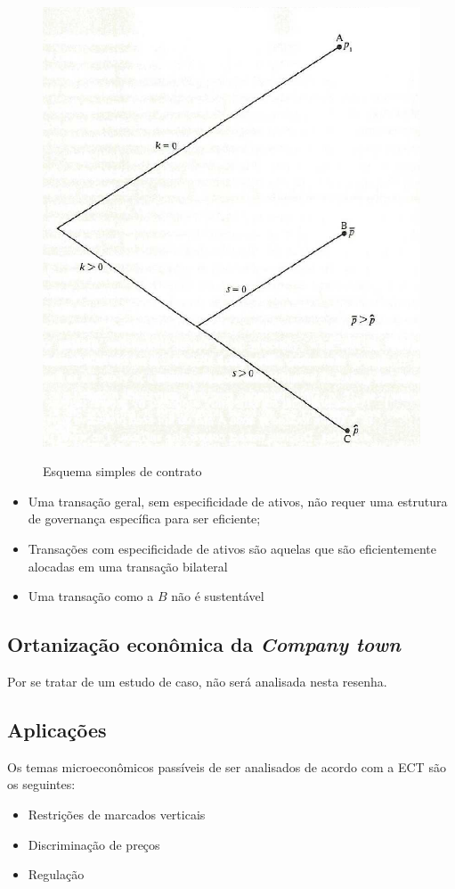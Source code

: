 \begin{figure}
	\centering
	\caption{Esquema simples de contrato}
	\includegraphics[width=0.7\linewidth]{screenshot003}
	\label{fig:screenshot003}
\end{figure}

\begin{itemize}
	\item Uma transação geral, sem especificidade de ativos, não requer uma estrutura de governança específica para ser eficiente;
	\item Transações com especificidade de ativos são aquelas que são eficientemente alocadas em uma transação bilateral
	\item Uma transação como a $B$ não é sustentável
\end{itemize}

\subsection*{Ortanização econômica da \textit{Company town}}

Por se tratar de um estudo de caso, não será analisada nesta resenha.

\subsection*{Aplicações}

Os temas microeconômicos passíveis de ser analisados de acordo com a ECT são os seguintes:
\begin{itemize}
	\item Restrições de marcados verticais
	\item Discriminação de preços
	\item Regulação
\end{itemize}

